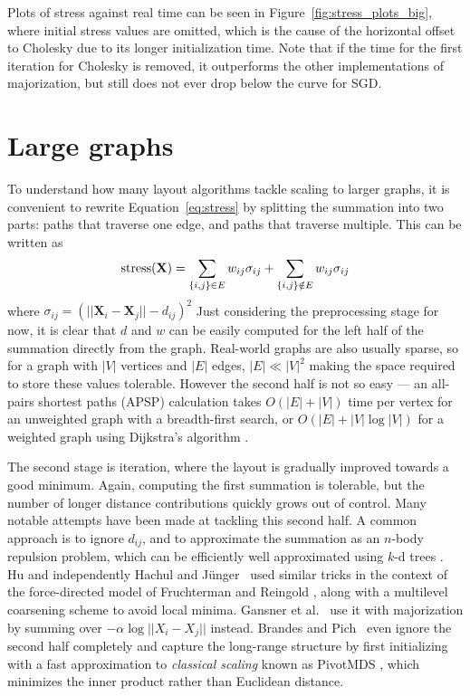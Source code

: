Plots of stress against real time can be seen in Figure~\ref{fig:stress_plots_big}, where initial stress values are omitted, which is the cause of the horizontal offset to Cholesky due to its longer initialization time.
Note that if the time for the first iteration for Cholesky is removed, it outperforms the other implementations of majorization, but still does not ever drop below the curve for SGD.


\section{Large graphs}
\label{sec:large_graphs}
To understand how many layout algorithms tackle scaling to larger graphs, it is convenient to rewrite Equation~\eqref{eq:stress} by splitting the summation into two parts: paths that traverse one edge, and paths that traverse multiple.
This can be written as
\begin{equation}
  \text{stress}(\mathbf{X}) = \sum_{\{i,j\}\in E}w_{ij}\sigma_{ij}\\
  + \sum_{\{i,j\}\notin E}w_{ij}\sigma_{ij}
  \label{split stress}
\end{equation}
where $\sigma_{ij} = (||\mathbf{X}_i - \mathbf{X}_j|| - d_{ij})^2$
Just considering the preprocessing stage for now, it is clear that $d$ and $w$ can be easily computed for the left half of the summation directly from the graph. Real-world graphs are also usually sparse, so for a graph with $|V|$ vertices and $|E|$ edges, $|E| \ll |V|^2$ making the space required to store these values tolerable. However the second half is not so easy --- an all-pairs shortest paths (APSP) calculation takes $O(|E| + |V|)$ time per vertex for an unweighted graph with a breadth-first search, or $O(|E| + |V|\log|V|)$ for a weighted graph using Dijkstra's algorithm \cite{Cormen2009}.

The second stage is iteration, where the layout is gradually improved towards a good minimum. Again, computing the first summation is tolerable, but the number of longer distance contributions quickly grows out of control. Many notable attempts have been made at tackling this second half. A common approach is to ignore $d_{ij}$, and to approximate the summation as an $n$-body repulsion problem, which can be efficiently well approximated using $k$-d trees \cite{Barnes1986}. Hu \cite{Hu2005} and independently Hachul and J\"unger~\cite{Hachul2004} used similar tricks in the context of the force-directed model of Fruchterman and Reingold \cite{Fruchterman1991}, along with a multilevel coarsening scheme to avoid local minima. Gansner et al.\ \cite{Gansner2013} use it with majorization by summing over $-\alpha \log||X_i - X_j||$ instead. Brandes and Pich~\cite{Brandes2007Eigensolver} even ignore the second half completely and capture the long-range structure by first initializing with a fast approximation to \emph{classical scaling} known as PivotMDS \cite{Brandes2008}, which minimizes the inner product rather than Euclidean distance.

